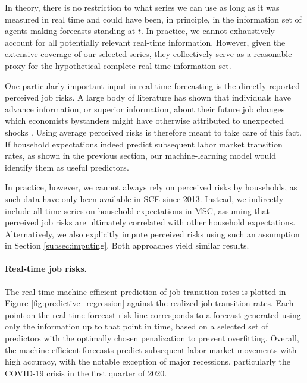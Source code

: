 In theory, there is no restriction to what series we can use as long as it was measured in real time and could have been, in principle, in the information set of agents making forecasts standing at $t$. In practice, we cannot exhaustively account for all potentially relevant real-time information. However, given the extensive coverage of our selected series, they collectively serve as a reasonable proxy for the hypothetical complete real-time information set.  

One particularly important input in real-time forecasting is the directly reported perceived job risks. A large body of literature has shown that individuals have advance information, or superior information, about their future job changes which economists bystanders might have otherwise attributed to unexpected shocks \citep{hendren2017knowledge}. Using average perceived risks is therefore meant to take care of this fact. If household expectations indeed predict subsequent labor market transition rates, as shown in the previous section, our machine-learning model would identify them as useful predictors. 

In practice, however, we cannot always rely on perceived risks by households, as such data have only been available in SCE since 2013. Instead, we indirectly include all time series on household expectations in MSC, assuming that perceived job risks are ultimately correlated with other household expectations. Alternatively, we also explicitly impute perceived risks using such an assumption in Section \ref{subsec:imputing}. Both approaches yield similar results.   


\paragraph{Real-time job risks.} 
The real-time machine-efficient prediction of job transition rates is plotted in Figure \ref{fig:predictive_regression} against the realized job transition rates. Each point on the real-time forecast risk line corresponds to a forecast generated using only the information up to that point in time, based on a selected set of predictors with the optimally chosen penalization to prevent overfitting. Overall, the machine-efficient forecasts predict subsequent labor market movements with high accuracy, with the notable exception of major recessions, particularly the COVID-19 crisis in the first quarter of 2020. 

